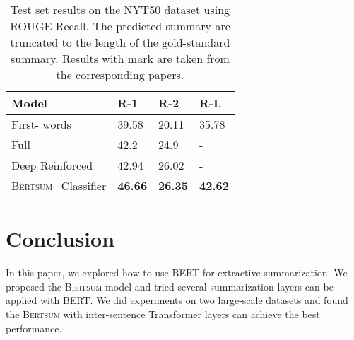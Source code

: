 \documentclass[11pt,a4paper]{article}
\begin{document}
    

    
    \begin{table}[!htbp]
        \center
        \begin{tabular}{l|lll}
            Model           & R-1    & R-2    & R-L    \\ \hline
            First- words   &39.58 & 20.11 & 35.78 \\
            Full            & 42.2  & 24.9  & -     \\
            Deep Reinforced & 42.94 &26.02 & -     \\
            \textsc{Bertsum}+Classifier          & \textbf{46.66}    &  \textbf{26.35 } & \textbf{42.62} 
        \end{tabular}
        \caption{Test set results on  the NYT50  dataset using  ROUGE Recall. The predicted summary are truncated to the length of the gold-standard summary. Results with  mark
            are taken from the corresponding papers.}
    \end{table}
    
            \section{Conclusion} 
            In this paper, we explored how to use BERT for extractive summarization.
            We proposed the \textsc{Bertsum} model and tried several summarization layers can be applied with BERT. We did experiments on two large-scale datasets and found the \textsc{Bertsum} with inter-sentence Transformer layers can achieve the best performance.
                        
            

    
    
    

    
\end{document}

